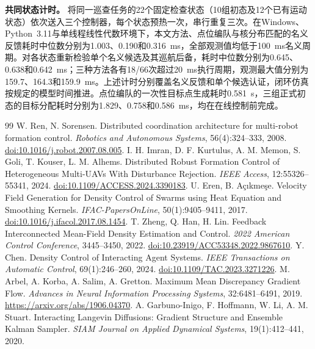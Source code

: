 \documentclass[UTF8,a4paper,11pt,fontset=none]{ctexart}
\begin{document}
\smallskip\noindent\textbf{共同状态计时。}
将同一巡查任务的22个固定检查状态（10组初态及12个已有运动状态）依次送入三个控制器，每个状态预热一次，串行重复三次。在Windows、Python~3.11与单线程线性代数环境下，本文方法、点位编队与核分布匹配的名义反馈耗时中位数分别为1.003、0.190和0.316~ms，全部观测值均低于100~ms名义周期。对各状态重新检验单个名义候选及其巡航后备，耗时中位数分别为0.645、0.638和0.642~ms；三种方法各有18/66次超过20~ms执行周期，观测最大值分别为159.7、164.3和159.9~ms。上述计时分别覆盖名义反馈和单个候选认证，闭环仿真按规定的模型时间推进。点位编队的一次性目标点生成耗时0.581~s，三组正式初态的目标分配耗时分别为1.829、0.758和0.586~ms，均在在线控制前完成。
\FloatBarrier

\begin{thebibliography}{99}\footnotesize
\setlength{\itemsep}{2pt}\setlength{\parskip}{0pt}
 W. Ren, N. Sorensen. Distributed coordination architecture for multi-robot formation control.
\emph{Robotics and Autonomous Systems}, 56(4):324--333, 2008.
\href{https://doi.org/10.1016/j.robot.2007.08.005}{doi:10.1016/j.robot.2007.08.005}.
 I. H. Imran, D. F. Kurtulus, A. M. Memon, S. Goli, T. Kouser, L. M. Alhems.
Distributed Robust Formation Control of Heterogeneous Multi-UAVs With Disturbance Rejection.
\emph{IEEE Access}, 12:55326--55341, 2024.
\href{https://doi.org/10.1109/ACCESS.2024.3390183}{doi:10.1109/ACCESS.2024.3390183}.
 U. Eren, B. Açıkmeşe.
Velocity Field Generation for Density Control of Swarms using Heat Equation and Smoothing Kernels.
\emph{IFAC-PapersOnLine}, 50(1):9405--9411, 2017.
\href{https://doi.org/10.1016/j.ifacol.2017.08.1454}{doi:10.1016/j.ifacol.2017.08.1454}.
 T. Zheng, Q. Han, H. Lin.
Feedback Interconnected Mean-Field Density Estimation and Control.
\emph{2022 American Control Conference}, 3445--3450, 2022.
\href{https://doi.org/10.23919/ACC53348.2022.9867610}{doi:10.23919/ACC53348.2022.9867610}.
 Y. Chen. Density Control of Interacting Agent Systems.
\emph{IEEE Transactions on Automatic Control}, 69(1):246--260, 2024.
\href{https://doi.org/10.1109/TAC.2023.3271226}{doi:10.1109/TAC.2023.3271226}.
 M. Arbel, A. Korba, A. Salim, A. Gretton.
Maximum Mean Discrepancy Gradient Flow.
\emph{Advances in Neural Information Processing Systems}, 32:6481--6491, 2019.
\url{https://arxiv.org/abs/1906.04370}.
 A. Garbuno-Inigo, F. Hoffmann, W. Li, A. M. Stuart.
Interacting Langevin Diffusions: Gradient Structure and Ensemble Kalman Sampler.
\emph{SIAM Journal on Applied Dynamical Systems}, 19(1):412--441, 2020.

\end{thebibliography}
\end{document}
